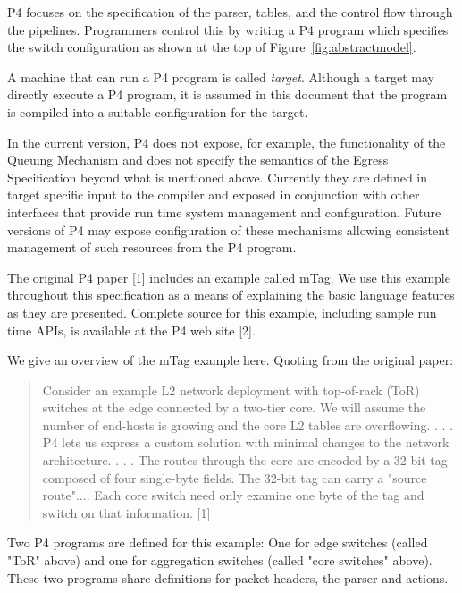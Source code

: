 \documentclass[12pt]{article}
\begin{document}
P4 focuses on the specification of the parser, \matchaction tables, and the 
control flow through the pipelines. Programmers control this by writing a 
P4 program which specifies the switch configuration as shown at the top of 
Figure~\ref{fig:abstractmodel}. 

A machine that can run a P4 program is called \textit{target}. Although a target 
may directly execute a P4 program, it is assumed in this document that the 
program is compiled into a suitable configuration for the target.

In the current version, P4 does not expose, for example, the functionality 
of the Queuing Mechanism and does not specify the semantics of the Egress 
Specification beyond what is mentioned above. Currently they are defined in 
target specific input to the compiler and exposed in conjunction with other 
interfaces that provide run time system management and configuration. Future 
versions of P4 may expose configuration of these mechanisms allowing consistent 
management of such resources from the P4 program.


The original P4 paper [1] includes an example called mTag. We use this example 
throughout this specification as a means of explaining the basic language 
features as they are presented. Complete source for this example, including 
sample run time APIs, is available at the P4 web site [2].

We give an overview of the mTag example here.  Quoting from the original paper:

\begin{quote}
Consider an example L2 network deployment with top-of-rack (ToR) switches 
at the edge connected by a two-tier core. We will assume the number of end-hosts 
is growing and the core L2 tables are overflowing. . . .  P4 lets us express a 
custom solution with minimal changes to the network architecture. . . . The routes 
through the core are encoded by a 32-bit tag composed of four single-byte 
fields.  The 32-bit tag can carry a "source route".... Each core switch need 
only examine one byte of the tag and switch on that information. [1]
\end{quote}

Two P4 programs are defined for this example: One for edge switches (called 
"ToR" above) and one for aggregation switches (called "core switches" above). 
These two programs share definitions for packet headers, the parser and actions.
\end{document}

